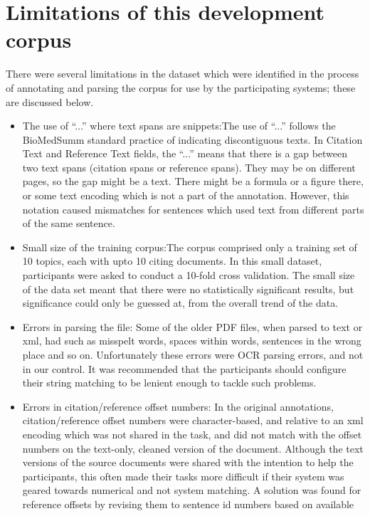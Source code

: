 \documentclass[11pt]{article}
\begin{document}
\section{Limitations of this development corpus}
There were several limitations in the dataset which were identified in the 
process of annotating and parsing the corpus for use by the participating 
systems; these are discussed below.
\begin{itemize}
\item{The use of ``...'' where text spans are snippets}:The use of ``...'' 
	follows the BioMedSumm standard practice of indicating discontiguous texts. 
	In Citation Text and Reference Text fields, the ``...'' means that there is 
	a gap between two text spans (citation spans or reference spans). They may be 
	on different pages, so the gap might be a text. There might be a formula or a 
	figure there, or some text encoding which is not a part of the annotation.
	However, this notation caused mismatches for sentences which used text from 
	different parts of the same sentence.
\item{Small size of the training corpus:}The corpus comprised only a training set 
	of 10 topics, each with upto 10 citing documents. In this small dataset, 
	participants were asked to conduct a 10-fold cross validation. The small 
	size of the data set meant that there were no statistically significant 
	results, but significance could only be guessed at, from the overall trend of 
	the data.
\item{Errors in parsing the file:} Some of the older PDF files, when parsed to 
	text or xml, had such as misspelt words, spaces within words, sentences in 
	the wrong place and so on. Unfortunately these errors were OCR parsing errors, 
	and not in our control. It was recommended that the participants should 
	configure their string matching to be lenient enough to tackle such problems.
\item{Errors in citation/reference offset numbers:} In the original annotations, 
	citation/reference offset numbers were character-based, and relative to an xml 
	encoding which was not shared in the task, and did not match with the offset 
	numbers on the text-only, cleaned version of the document. Although the text 
	versions of the source documents were shared with the intention to help the 
	participants, this often made their tasks more difficult if their system was 
	geared towards numerical and not system matching. A solution was found for 
	reference offsets by revising them to sentence id numbers based on available 

\end{itemize}
\end{document}

